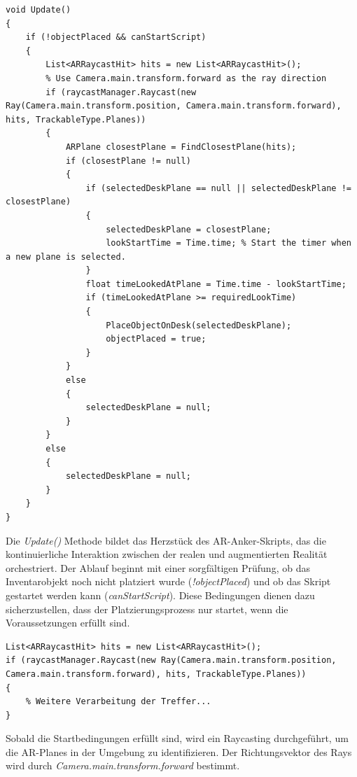 \begin{lstlisting}[style=csharp, caption={Update Funktion}, label=code:Update]
void Update()
{
    if (!objectPlaced && canStartScript)
    {
        List<ARRaycastHit> hits = new List<ARRaycastHit>();
        % Use Camera.main.transform.forward as the ray direction
        if (raycastManager.Raycast(new Ray(Camera.main.transform.position, Camera.main.transform.forward), hits, TrackableType.Planes))
        {
            ARPlane closestPlane = FindClosestPlane(hits);
            if (closestPlane != null)
            {
                if (selectedDeskPlane == null || selectedDeskPlane != closestPlane)
                {
                    selectedDeskPlane = closestPlane;
                    lookStartTime = Time.time; % Start the timer when a new plane is selected.
                }
                float timeLookedAtPlane = Time.time - lookStartTime;
                if (timeLookedAtPlane >= requiredLookTime)
                {
                    PlaceObjectOnDesk(selectedDeskPlane);
                    objectPlaced = true;
                }
            }
            else
            {
                selectedDeskPlane = null;
            }
        }
        else
        {
            selectedDeskPlane = null;
        }
    }
}
\end{lstlisting}
Die \textit{Update()} Methode bildet das Herzstück des AR-Anker-Skripts, das die kontinuierliche Interaktion zwischen
der realen und augmentierten Realität orchestriert. Der Ablauf beginnt mit einer sorgfältigen Prüfung, ob das
Inventarobjekt noch nicht platziert wurde (\textit{!objectPlaced}) und ob das Skript gestartet werden kann
(\textit{canStartScript}). Diese Bedingungen dienen dazu sicherzustellen, dass der Platzierungsprozess nur startet,
wenn die Voraussetzungen erfüllt sind.\\

\begin{lstlisting}[style=csharp, caption={Raycasting}, label=code:Raycasting]
List<ARRaycastHit> hits = new List<ARRaycastHit>();
if (raycastManager.Raycast(new Ray(Camera.main.transform.position, Camera.main.transform.forward), hits, TrackableType.Planes))
{
    % Weitere Verarbeitung der Treffer...
}
\end{lstlisting}
Sobald die Startbedingungen erfüllt sind, wird ein Raycasting durchgeführt, um die AR-Planes in der Umgebung zu
identifizieren. Der Richtungsvektor des Rays wird durch \textit{Camera.main.transform.forward} bestimmt.\\


